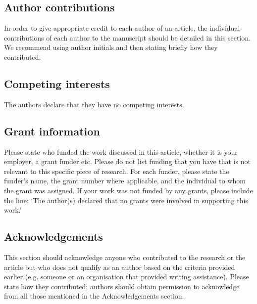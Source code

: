 \documentclass[twocolumn]{article}
\begin{document}
\subsection*{Author contributions}
In order to give appropriate credit to each author of an article, the individual
contributions of each author to the manuscript should be detailed in this section. We
recommend using author initials and then stating briefly how they contributed.

\subsection*{Competing interests}

The authors declare that they have no competing interests.


\subsection*{Grant information}
Please state who funded the work discussed in this article, whether it is your employer,
a grant funder etc. Please do not list funding that you have that is not relevant to this
specific piece of research. For each funder, please state the funder’s name, the grant
number where applicable, and the individual to whom the grant was assigned.
If your work was not funded by any grants, please include the line: ‘The author(s)
declared that no grants were involved in supporting this work.’

\subsection*{Acknowledgements}
This section should acknowledge anyone who contributed to the research or the
article but who does not qualify as an author based on the criteria provided earlier
(e.g. someone or an organisation that provided writing assistance). Please state how
they contributed; authors should obtain permission to acknowledge from all those
mentioned in the Acknowledgements section.
\end{document}
